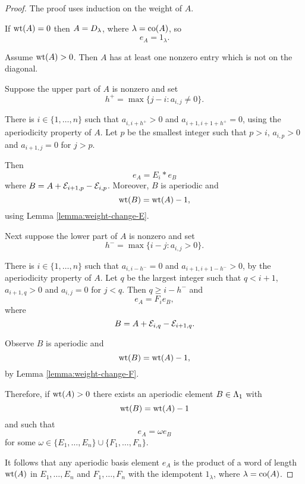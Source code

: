 \documentclass[a4paper, 11pt, twoside]{report}
\begin{document}
\begin{proof}
The proof uses induction on the weight of $A$.

If $\operatorname{wt}(A)=0$ then $A=D_{\lambda}$, where $\lambda=\operatorname{co}(A)$, so
\begin{equation*}
e_A = 1_\lambda.
\end{equation*}

Assume $\operatorname{wt}(A)>0$. Then $A$ has at least one nonzero entry which is not on the diagonal.

Suppose the upper part of $A$ is nonzero and set
\begin{equation*}
h^+ = \max\{j-i:a_{i,j}\neq 0\}.
\end{equation*}

There is $i\in\{1,\ldots,n\}$ such that $a_{i,i+h^{+}}>0$ and $a_{i+1,i+1+h^{+}}=0$, using the aperiodicity property of $A$. Let $p$ be the smallest integer such that $p>i$, $a_{i,p}>0$ and $a_{i+1,j}=0$ for $j>p$.

Then
\begin{equation*}
e_A = E_i\ast e_B
\end{equation*}
where $B=A+\mathcal{E}_{i+1,p} -\mathcal{E}_{i,p}$. Moreover, $B$ is aperiodic and
\begin{equation*}
\operatorname{wt}(B) = \operatorname{wt}(A)-1,
\end{equation*}
using Lemma \ref{lemma:weight-change-E}.

Next suppose the lower part of $A$ is nonzero and set
\begin{equation*}
h^- = \max\{i-j:a_{i,j}>0\}.
\end{equation*}

There is $i\in\{1,\ldots,n\}$ such that $a_{i,i-h^{-}}=0$ and $a_{i+1,i+1-h^{-}}>0$, by the aperiodicity property of $A$. Let $q$ be the largest integer such that $q<i+1$, $a_{i+1,q}>0$ and $a_{i,j}=0$ for $j<q$. Then $q\geq i-h^{-}$ and
\begin{equation*}
e_A = F_i e_B,
\end{equation*}
where
\begin{equation*}
B = A + \mathcal{E}_{i,q} - \mathcal{E}_{i+1,q}.
\end{equation*}

Observe $B$ is aperiodic and
\begin{equation*}
\operatorname{wt}(B) = \operatorname{wt}(A)-1,
\end{equation*}
by Lemma \ref{lemma:weight-change-F}.

Therefore, if $\operatorname{wt}(A)>0$ there exists an aperiodic element $B\in\Lambda_1{}$ with
\begin{equation*}
\operatorname{wt}(B) = \operatorname{wt}(A) - 1
\end{equation*}
and such that
\begin{equation*}
e_A = \omega e_B
\end{equation*}
for some $\omega\in\{E_1,\ldots,E_n\}\cup\{F_1,\ldots,F_n\}$.

It follows that any aperiodic basis element $e_A$ is the product of a word of length $\operatorname{wt}(A)$ in $E_1,\ldots,E_n$ and $F_1,\ldots,F_n$ with the idempotent $1_\lambda$, where $\lambda=\operatorname{co}(A)$.
\end{proof}
\end{document}
